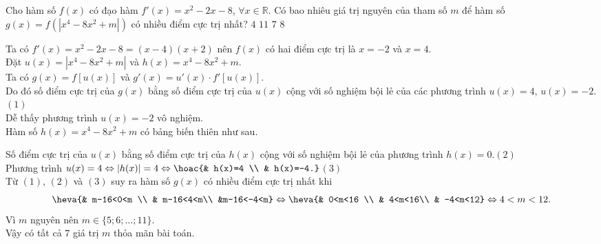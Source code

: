 \begin{ex}%
	Cho hàm số $f(x)$ có đạo hàm $f'(x)=x^2-2x-8$, $\forall x \in \mathbb{R}$. Có bao nhiêu giá trị nguyên của tham số $m$ để hàm số $g(x)=f\left(\left|x^4-8x^2+m\right|\right)$ có nhiều điểm cực trị nhất?
	\choice
	{$4$}
	{$11$}
	{\True $7$}
	{$8$}
	\loigiai
	{Ta có $f'(x)=x^2-2x-8=(x-4)(x+2)$ nên $f(x)$ có hai điểm cực trị là $x=-2$ và $x=4$.\\
	Đặt $u(x)=\left|x^4-8x^2+m\right|$ và $h(x)=x^4-8x^2+m$.\\
	Ta có $g(x)=f\left[u(x)\right]$ và $g'(x)=u'(x)\cdot f'\left[u(x)\right]$.\\
	Do đó số điểm cực trị của $g(x)$ bằng số điểm cực trị của $u(x)$ cộng với số nghiệm bội lẻ của các phương trình $u(x)=4$, $u(x)=-2$.\quad $(1)$\\
	Dễ thấy phương trình $u(x)=-2$ vô nghiệm.\\
	Hàm số $h(x)=x^4-8x^2+m$ có bảng biến thiên như sau.
	\begin{center}
	\end{center}
	Số điểm cực trị của $u(x)$ bằng số điểm cực trị của $h(x)$ cộng với số nghiệm bội lẻ của phương trình $h(x)=0$.\quad $(2)$\\
	Phương trình $u(x)=4\Leftrightarrow \left|h(x)\right|=4\Leftrightarrow\hoac{& h(x)=4 \\ & h(x)=-4.}$\quad $(3)$\\
	Từ $(1)$, $(2)$ và $(3)$ suy ra hàm số $g(x)$ có nhiều điểm cực trị nhất khi $$\heva{& m-16<0<m \\ & m-16<4<m\\ &m-16<-4<m}\Leftrightarrow\heva{& 0<m<16 \\ & 4<m<16\\ & -4<m<12}\Leftrightarrow 4<m<12.$$
	Vì $m$ nguyên nên $m\in\{5;6;\ldots;11\}$.\\
	Vậy có tất cả $7$ giá trị $m$ thỏa mãn bài toán.
	}
\end{ex}

